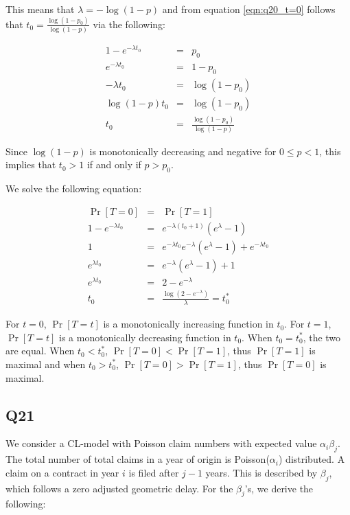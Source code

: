 \documentclass[11pt]{article}
\begin{document}
This means that $\lambda = -\log(1-p)$ and from equation \ref{eqn:q20_t=0} follows that $t_{0} = \frac{\log(1 - p_{0})}{\log(1-p)}$ via the following:

\begin{eqnarray}
1 - e^{-\lambda t_{0}} &=& p_{0} \\
e^{-\lambda t_{0}} &=& 1 - p_{0} \\
-\lambda t_{0} &=& \log(1 - p_{0}) \\
\log(1-p) t_{0} &=& \log(1 - p_{0}) \\
t_{0} &=& \frac{\log(1 - p_{0})}{\log(1-p)}
\end{eqnarray}

Since $\log(1-p)$ is monotonically decreasing and negative for $0 \leq p < 1$, this implies that $t_{0} > 1 $ if and only if $p > p_{0}$.

We solve the following equation:

\begin{eqnarray}
\Pr[T=0] &=& \Pr[T=1] \\
1 - e^{-\lambda t_{0}} &=& e^{-\lambda (t_{0} + 1)}(e^{\lambda}-1) \\
1 &=& e^{-\lambda t_{0}}e^{-\lambda}(e^{\lambda}-1) + e^{-\lambda t_{0}} \\
e^{\lambda t_{0}} &=& e^{-\lambda}(e^{\lambda}-1) +1 \\
e^{\lambda t_{0}} &=& 2 - e^{-\lambda} \\
t_{0} &=& \frac{\log(2 - e^{-\lambda})}{\lambda } = t_{0}^{*}
\end{eqnarray} 

For $t = 0$, $\Pr[T=t]$ is a monotonically increasing function in $t_{0}$. For $t = 1$, $\Pr[T=t]$ is a monotonically decreasing function in $t_{0}$. When $t_{0}= t_{0}^{*}$, the two are equal. When $t_{0}< t_{0}^{*}$, $\Pr[T=0] < \Pr[T=1]$, thus $\Pr[T=1]$ is maximal and when $t_{0} > t_{0}^{*}$, $\Pr[T=0] > \Pr[T=1]$, thus $\Pr[T=0]$ is maximal.

\subsection*{Q21}

We consider a CL-model with Poisson claim numbers with expected value $\alpha_{i}\beta_{j}$. The total number of total claims in a year of origin is Poisson($\alpha_{i}$) distributed. A claim on a contract in year $i$ is filed after $j-1$ years. This is described by $\beta_{j}$, which follows a zero adjusted geometric delay. For the $\beta_{j}$'s, we derive the following:
\end{document}
